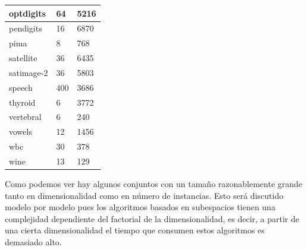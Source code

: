 \begin{table}[H]
\begin{tabular}{|l|l|l|}
		optdigits                                   & 64                                                  & 5216                                                     \\ \hline
		pendigits                                   & 16                                                  & 6870                                                     \\ \hline
		pima                                        & 8                                                   & 768                                                      \\ \hline
		satellite                                   & 36                                                  & 6435                                                     \\ \hline
		satimage-2                                  & 36                                                  & 5803                                                     \\ \hline
		speech                                      & 400                                                 & 3686                                                     \\ \hline
		thyroid                                     & 6                                                   & 3772                                                     \\ \hline
		vertebral                                   & 6                                                   & 240                                                      \\ \hline
		vowels                                      & 12                                                  & 1456                                                     \\ \hline
		wbc                                         & 30                                                  & 378                                                      \\ \hline
		wine                                        & 13                                                  & 129                                                      \\ \hline
	\end{tabular}
\end{table}

Como podemos ver hay algunos conjuntos con un tamaño razonablemente grande tanto en dimensionalidad como en número de instancias. Esto será discutido modelo por modelo pues los algoritmos basados en subespacios tienen una complejidad dependiente del factorial de la dimensionalidad, es decir, a partir de una cierta dimensionalidad el tiempo que consumen estos algoritmos es demasiado alto.


